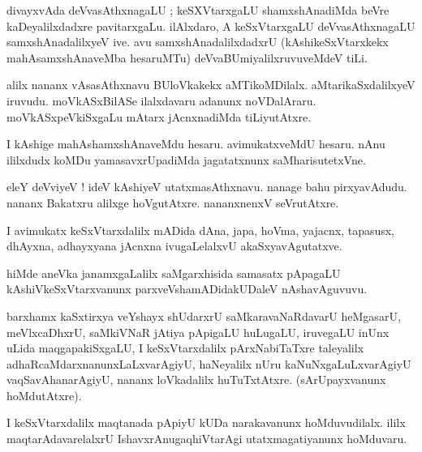 \documentclass{article}
\begin{document}
\begin{mn}
divayxvAda deVvasAthxnagaLU ; keSXVtarxgaLU shamxshAnadiMda beVre kaDeyalilxdadxre pavitarxgaLu. 
ilAlxdaro, A keSxVtarxgaLU deVvasAthxnagaLU samxshAnadalilxyeV ive. avu samxshAnadalilxdadxrU
(kAshikeSxVtarxkekx mahAsamxshAnaveMba hesaruMTu) deVvaBUmiyalilxruvuveMdeV tiLi.
\end{mn}

\begin{mn}
alilx nananx vAsasAthxnavu BUloVkakekx aMTikoMDilalx. aMtarikaSxdalilxyeV iruvudu. moVkASxBilASe 
ilalxdavaru adanunx noVDalAraru. moVkASxpeVkiSxgaLu mAtarx jAcnxnadiMda tiLiyutAtxre.
\end{mn}

\begin{mn}
I kAshige mahAshamxshAnaveMdu hesaru. avimukatxveMdU hesaru. nAnu ililxdudx koMDu yamasavxrUpadiMda 
jagatatxnunx saMharisutetxVne.
\end{mn}

\begin{mn}
eleY deVviyeV ! ideV kAshiyeV utatxmasAthxnavu. nanage bahu pirxyavAdudu. nananx Bakatxru alilxge 
hoVgutAtxre. nananxnenxV seVrutAtxre.
\end{mn}

\begin{mn}
I avimukatx keSxVtarxdalilx mADida dAna, japa, hoVma, yajacnx, tapasusx, dhAyxna, adhayxyana jAcnxna
ivugaLelalxvU akaSxyavAgutatxve.
\end{mn}

\begin{mn}
hiMde aneVka janamxgaLalilx saMgarxhisida samasatx pApagaLU kAshiVkeSxVtarxvanunx 
parxveVshamADidakUDaleV nAshavAguvuvu.
\end{mn}

\begin{mn}
barxhamx kaSxtirxya veYshayx shUdarxrU saMkaravaNaRdavarU heMgasarU, meVlxcaDhxrU, saMkiVNaR 
jAtiya pApigaLU huLugaLU, iruvegaLU inUnx uLida maqgapakiSxgaLU, I keSxVtarxdalilx pArxNabiTaTxre 
taleyalilx adhaRcaMdarxnanunxLaLxvarAgiyU, haNeyalilx nUru kaNuNxgaLuLxvarAgiyU 
vaqSavAhanarAgiyU, nananx loVkadalilx huTuTxtAtxre. (sArUpayxvanunx hoMdutAtxre). 
\end{mn}

\begin{mn}
I keSxVtarxdalilx maqtanada pApiyU kUDa narakavanunx hoMduvudilalx. ililx maqtarAdavarelalxrU 
IshavxrAnugaqhiVtarAgi utatxmagatiyanunx hoMduvaru.
\end{mn}
\end{document}
